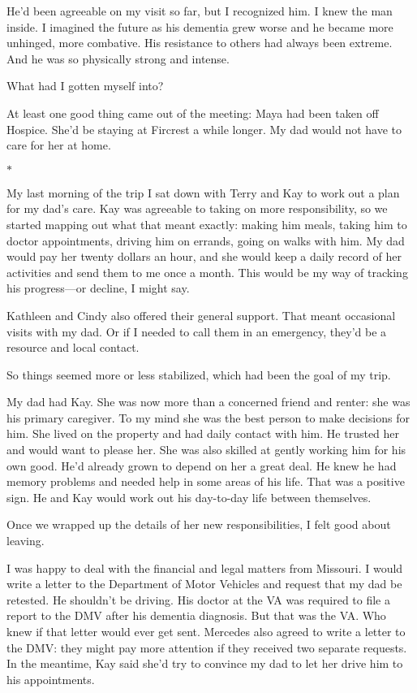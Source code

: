 \documentclass[12pt]{book}
\begin{document}
He'd been agreeable on my visit so far, but I recognized him. I knew the man inside. I imagined the future as his dementia grew worse and he became more unhinged, more combative. His resistance to others had always been extreme. And he was so physically strong and intense.

What had I gotten myself into?

At least one good thing came out of the meeting: Maya had been taken off Hospice. She'd be staying at Fircrest a while longer. My dad would not have to care for her at home.

\begin{center}$*$\end{center}

My last morning of the trip I sat down with Terry and Kay to work out a plan for my dad's care. Kay was agreeable to taking on more responsibility, so we started mapping out what that meant exactly: making him meals, taking him to doctor appointments, driving him on errands, going on walks with him. My dad would pay her twenty dollars an hour, and she would keep a daily record of her activities and send them to me once a month. This would be my way of tracking his progress---or decline, I might say.

Kathleen and Cindy also offered their general support. That meant occasional visits with my dad. Or if I needed to call them in an emergency, they'd be a resource and local contact.

So things seemed more or less stabilized, which had been the goal of my trip.

My dad had Kay. She was now more than a concerned friend and renter: she was his primary caregiver. To my mind she was the best person to make decisions for him. She lived on the property and had daily contact with him. He trusted her and would want to please her. She was also skilled at gently working him for his own good. He'd already grown to depend on her a great deal. He knew he had memory problems and needed help in some areas of his life. That was a positive sign. He and Kay would work out his day-to-day life between themselves.

Once we wrapped up the details of her new responsibilities, I felt good about leaving.

I was happy to deal with the financial and legal matters from Missouri. I would write a letter to the Department of Motor Vehicles and request that my dad be retested. He shouldn't be driving. His doctor at the VA was required to file a report to the DMV after his dementia diagnosis. But that was the VA. Who knew if that letter would ever get sent. Mercedes also agreed to write a letter to the DMV: they might pay more attention if they received two separate requests. In the meantime, Kay said she'd try to convince my dad to let her drive him to his appointments.
\end{document}
